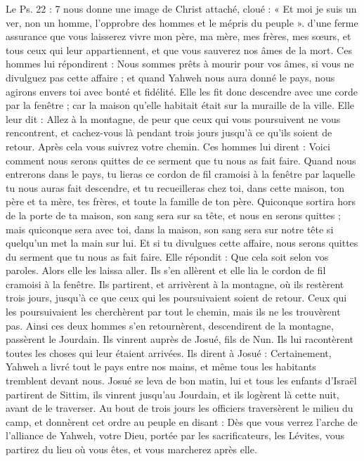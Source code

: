 \begin{multicols}{2}
{Le Ps. 22 : 7 nous donne une image de Christ attaché, cloué : « Et moi je suis un ver, non un homme, l’opprobre des hommes et le mépris du peuple ».} d’une ferme assurance que vous laisserez vivre mon père, ma mère, mes frères, mes sœurs, et tous ceux qui leur appartiennent, et que vous sauverez nos âmes de la mort.
Ces hommes lui répondirent : Nous sommes prêts à mourir pour vos âmes, si vous ne divulguez pas cette affaire ; et quand Yahweh nous aura donné le pays, nous agirons envers toi avec bonté et fidélité.
Elle les fit donc descendre avec une corde par la fenêtre ; car la maison qu’elle habitait était sur la muraille de la ville.
Elle leur dit : Allez à la montagne, de peur que ceux qui vous poursuivent ne vous rencontrent, et cachez-vous là pendant trois jours jusqu’à ce qu’ils soient de retour. Après cela vous suivrez votre chemin.
Ces hommes lui dirent : Voici comment nous serons quittes de ce serment que tu nous as fait faire.
Quand nous entrerons dans le pays, tu lieras ce\FTNT{} cordon de fil cramoisi à la fenêtre par laquelle tu nous auras fait descendre, et tu recueilleras chez toi, dans cette maison, ton père et ta mère, tes frères, et toute la famille de ton père.
Quiconque sortira hors de la porte de ta maison, son sang sera sur sa tête, et nous en serons quittes ; mais quiconque sera avec toi, dans la maison, son sang sera sur notre tête si quelqu’un met la main sur lui.
Et si tu divulgues cette affaire, nous serons quittes du serment que tu nous as fait faire.
Elle répondit : Que cela soit selon vos paroles. Alors elle les laissa aller. Ils s’en allèrent et elle lia le cordon de fil cramoisi à la fenêtre.
Ils partirent, et arrivèrent à la montagne, où ils restèrent trois jours, jusqu’à ce que ceux qui les poursuivaient soient de retour. Ceux qui les poursuivaient les cherchèrent par tout le chemin, mais ils ne les trouvèrent pas.
Ainsi ces deux hommes s’en retournèrent, descendirent de la montagne, passèrent le Jourdain. Ils vinrent auprès de Josué, fils de Nun. Ils lui racontèrent toutes les choses qui leur étaient arrivées.
Ils dirent à Josué : Certainement, Yahweh a livré tout le pays entre nos mains, et même tous les habitants tremblent devant nous.
\VerseOne{}Josué se leva de bon matin, lui et tous les enfants d’Israël partirent de Sittim, ils vinrent jusqu’au Jourdain, et ils logèrent là cette nuit, avant de le traverser.
Au bout de trois jours les officiers traversèrent le milieu du camp,
et donnèrent cet ordre au peuple en disant : Dès que vous verrez l’arche de l’alliance de Yahweh, votre Dieu, portée par les sacrificateurs, les Lévites, vous partirez du lieu où vous êtes, et vous marcherez après elle.

\end{multicols}
